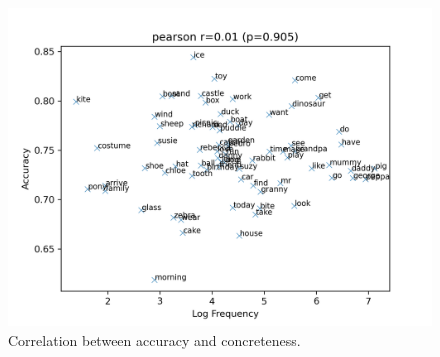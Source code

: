 \begin{figure}
  \centering
  \includegraphics[width=\textwidth]{results/targeted_triplets/correlation_frequency_acc_version_206980.png}
  \caption{Correlation between accuracy and concreteness.}
  \label{fig:results_correlation_concreteness_acc}
\end{figure}


